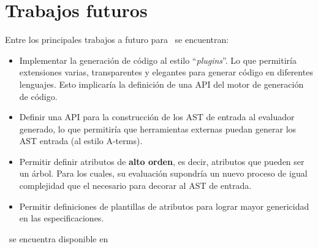 \section{Trabajos futuros}
Entre los principales trabajos a futuro para \maggen\ se encuentran:
\begin{itemize}

\item Implementar la generación de código al estilo ``\textit{plugins}''. Lo que permitiría extensiones varias, transparentes y elegantes para generar código en diferentes lenguajes. Esto implicaría la definición de una API del motor de generación de código.

\item Definir una API para la construcción de los AST de entrada al evaluador generado, lo que permitiría que herramientas externas puedan generar los AST entrada (al estilo A-terms).


\item Permitir definir atributos de \textbf{alto orden}, es decir, atributos que pueden ser un árbol. Para los cuales, su evaluación supondría un nuevo proceso de igual complejidad que el necesario para decorar al AST de entrada.

\item Permitir definiciones de plantillas de atributos para lograr mayor genericidad en las especificaciones.

\end{itemize}


\maggen\ se encuentra disponible en 